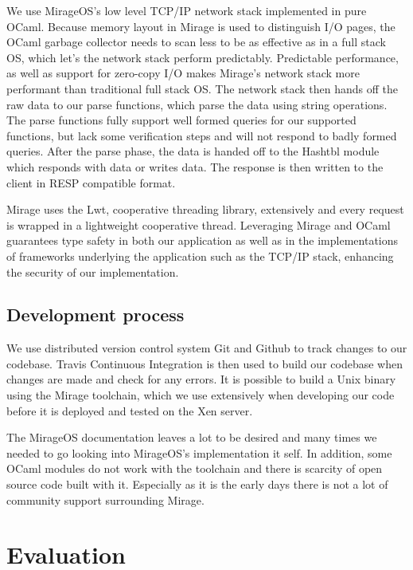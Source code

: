 \documentclass[english,10pt,twocolumn]{article}
\begin{document}
We use MirageOS's low level TCP/IP network stack implemented in pure OCaml.
Because memory layout in Mirage is used to distinguish I/O pages, the OCaml garbage collector needs to scan less to be as effective as in a full stack OS, which let's the network stack perform predictably.
Predictable performance, as well as support for zero-copy I/O makes Mirage's network stack more performant than traditional full stack OS.
The network stack then hands off the raw data to our parse functions, which parse the data using string operations.
The parse functions fully support well formed queries for our supported functions, but lack some verification steps and will not respond to badly formed queries.
After the parse phase, the data is handed off to the Hashtbl module which responds with data or writes data.
The response is then written to the client in RESP compatible format.

Mirage uses the Lwt, cooperative threading library, extensively and every request is wrapped in a lightweight cooperative thread. Leveraging Mirage and OCaml guarantees type safety in both our application as well as in the implementations of frameworks underlying the application such as the TCP/IP stack, enhancing the security of our implementation.


\subsection{Development process}

We use distributed version control system Git and Github to track changes to our codebase.
Travis Continuous Integration is then used to build our codebase when changes are made and check for any errors.
It is possible to build a Unix binary using the Mirage toolchain, which we use extensively when developing our code before it is deployed and tested on the Xen server.

The MirageOS documentation leaves a lot to be desired and many times we needed to go looking into MirageOS's implementation it self.
In addition, some OCaml modules do not work with the toolchain and there is scarcity of open source code built with it.
Especially as it is the early days there is not a lot of community support surrounding Mirage.


\section{Evaluation}
\end{document}
